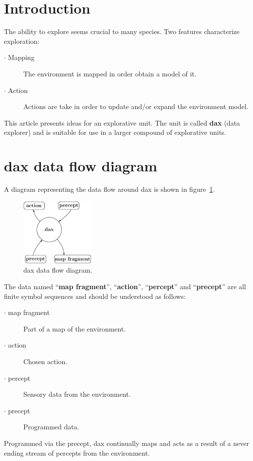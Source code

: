 
\section{Introduction}
The ability to explore seems crucial to many species.\hfill\break\break
Two features characterize exploration:
\begin{description}
        \item[$\cdot$ Mapping] The environment is mapped in order obtain
                               a model of it.
        \item[$\cdot$ Action] Actions are take in order to update and/or expand
                              the environment model.
\end{description}
This article presents ideas for an explorative unit. The unit is called {\bf dax}
(data explorer) and is suitable for use in a larger compound of explorative units.

\section{dax data flow diagram}
A diagram representing the data flow around dax is shown in
figure~\ref{fig:daxDiagram}.
\begin{figure}[ht]
  \begin{center}
  \includegraphics[width=0.33\textwidth, keepaspectratio]
                  {Eps/daxDiagram.eps}
  \end{center}
  \caption{dax data flow diagram.}
  \label{fig:daxDiagram}
\end{figure}
\hfill\break
The data named ``{\bf map fragment}'', ``{\bf action}'', ``{\bf percept}''
and ``{\bf precept}'' are all finite symbol sequences and should be understood
as follows:
\begin{description}
        \item[$\cdot$ map fragment] Part of a map of the environment.
        \item[$\cdot$ action] Chosen action.
        \item[$\cdot$ percept] Sensory data from the environment.
        \item[$\cdot$ precept] Programmed data.
\end{description}
Programmed via the precept, dax continually maps and acts as a result
of a never ending stream of percepts from the environment.

